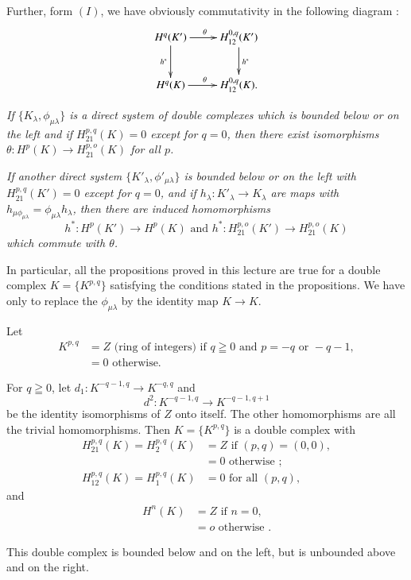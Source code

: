  Further, form $(I)$, we have obviously commutativity in the following
 diagram : 
\[
\xymatrix{
H^q(K') \ar[r]^{\theta}\ar[d]_{h^{\ast}} & H^{0,q}_{12}(K')
\ar[d]^{h^{\ast}}\\
H^q(K) \ar[r]^{\theta} & H^{0,q}_{12}(K).
}
\]

\medskip
{}
\textit{If $\bigg\{K_{\lambda}, \phi_{\mu \lambda} \bigg\}$ is a direct
  system of double complexes which is bounded below or on the left and
  if  $H^{p,q}_{21} (K) = 0$  except for $q = 0$,  then there exist
  isomorphisms $\theta : H^p(K) \rightarrow H^{p,o}_{21} (K)$ for all
$p$.}

\textit{If another direct system $\bigg\{ K'_{\lambda} , \phi'_{\mu \lambda}
\bigg\}$ is bounded below or on the left with  $H^{p,q}_{21}
  (K') = 0$ except for $q=0$, and if $h_{\lambda} : K'_{\lambda}
  \rightarrow K_{\lambda}$ are maps with $h_{\mu \phi_{\mu \lambda}} =
  \phi_{\mu \lambda} h_{\lambda}$, then there are induced
  homomorphisms 
 $$
 h^\ast : H^p(K') \rightarrow H^p (K) \text{ and } h^\ast :
 H^{p,o}_{21} (K')  \rightarrow H^{p,o}_{21} (K)  
 $$
which commute with $\theta$.}
 
 \begin{remark*}%
In particular, all the propositions proved in this lecture are true
for a double complex $K = \bigg\{K^{p,q} \bigg\}$ satisfying the
conditions stated in the propositions. We have only to replace the
$\phi_{\mu \lambda}$ by the identity map $K \rightarrow K$. 
 \end{remark*} 

 \begin{exam}%
Let\pageoriginale
\begin{align*}
K^{p,q} & = Z \text{ (ring of integers) if  } q \geqq 0 \text{ and } p = - q
\text{ or  } - q-1, \\ 
& = 0 \text{ otherwise. }
\end{align*}

 For $q \geqq 0$, let $d_1 : K^{-q-1, q} \rightarrow K^{-q,q}$ 
 and 
 $$
 d^2 : K^{-q-1,q} \rightarrow K^{-q-1, q+1} 
 $$
 be the identity isomorphisms of $Z$ onto itself. The other 
 homomorphisms are all the trivial homomorphisms. Then $K = \bigg\{
 K^{p,q} \bigg\}$ is a double complex with 
 \begin{align*}
H^{p,q}_{21}(K)  = H^{p,q}_{2}(K) & = Z  \text { if } (p,q) = (0,0),\\ 
& = 0 \text{ otherwise };\\
H^{p,q}_{12}(K)  = H^{p,q}_{1}(K) &= 0 \text{ for all } (p,q),
 \end{align*} 
 and 
 \begin{align*}
H^n(K) & = Z \text { if } n= 0, \\
& = o \text { otherwise }.
 \end{align*} 
 
 This double complex is bounded below and on the left, but is
 unbounded above and on the right.	 
 \end{exam}


